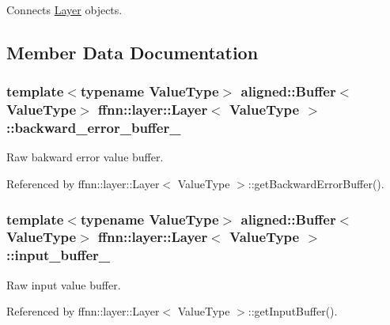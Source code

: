 Connects \hyperlink{classffnn_1_1layer_1_1_layer}{Layer} objects. 



\subsection{Member Data Documentation}
\hypertarget{classffnn_1_1layer_1_1_layer_a5509038fd1d1d06edd90af93013c35e1}{
\subsubsection[{backward\-\_\-error\-\_\-buffer\-\_\-}]{\setlength{\rightskip}{0pt plus 5cm}template$<$typename Value\-Type$>$ {\bf aligned\-::\-Buffer}$<$Value\-Type$>$ {\bf ffnn\-::layer\-::\-Layer}$<$ Value\-Type $>$\-::backward\-\_\-error\-\_\-buffer\-\_\-\hspace{0.3cm}{\ttfamily [protected]}}}\label{classffnn_1_1layer_1_1_layer_a5509038fd1d1d06edd90af93013c35e1}


Raw bakward error value buffer. 



Referenced by ffnn\-::layer\-::\-Layer$<$ Value\-Type $>$\-::get\-Backward\-Error\-Buffer().

\hypertarget{classffnn_1_1layer_1_1_layer_a4fca9b89de71c97f1d7747e15c14329a}{
\subsubsection[{input\-\_\-buffer\-\_\-}]{\setlength{\rightskip}{0pt plus 5cm}template$<$typename Value\-Type$>$ {\bf aligned\-::\-Buffer}$<$Value\-Type$>$ {\bf ffnn\-::layer\-::\-Layer}$<$ Value\-Type $>$\-::input\-\_\-buffer\-\_\-\hspace{0.3cm}{\ttfamily [protected]}}}\label{classffnn_1_1layer_1_1_layer_a4fca9b89de71c97f1d7747e15c14329a}


Raw input value buffer. 



Referenced by ffnn\-::layer\-::\-Layer$<$ Value\-Type $>$\-::get\-Input\-Buffer().

